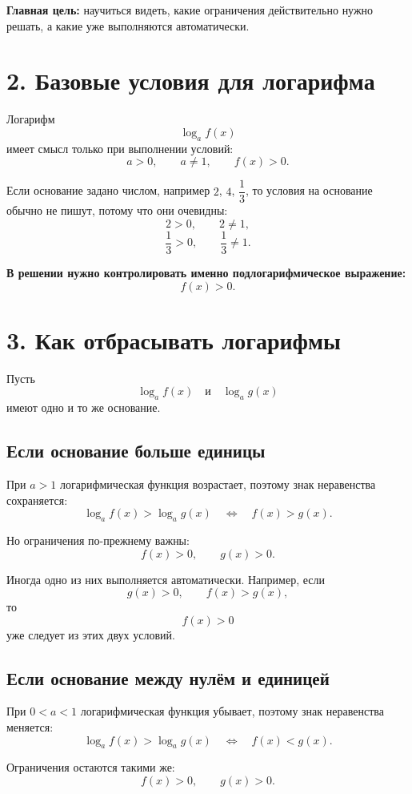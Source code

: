 \documentclass[a4paper,12pt]{article}
\newcommand{\sectionline}{\vspace{0.35em}{\color{accent}\hrule height 0.6pt}\vspace{0.65em}}
\newcommand{\important}[1]{\textcolor{darkaccent}{\textbf{#1}}}
\begin{document}
\important{Главная цель:} научиться видеть, какие ограничения действительно нужно решать, а какие уже выполняются автоматически.

\section*{\textcolor{darkaccent}{2. Базовые условия для логарифма}}
\sectionline

Логарифм
\[
\log_a f(x)
\]
имеет смысл только при выполнении условий:
\[
a>0,\qquad a\ne1,\qquad f(x)>0.
\]

Если основание задано числом, например $2$, $4$, $\dfrac13$, то условия на основание обычно не пишут, потому что они очевидны:
\[
2>0,\qquad 2\ne1,
\]
\[
\frac13>0,\qquad \frac13\ne1.
\]

\important{В решении нужно контролировать именно подлогарифмическое выражение:}
\[
f(x)>0.
\]

\section*{\textcolor{darkaccent}{3. Как отбрасывать логарифмы}}
\sectionline

Пусть
\[
\log_a f(x) \quad \text{и} \quad \log_a g(x)
\]
имеют одно и то же основание.

\subsection*{\textcolor{accent}{Если основание больше единицы}}

При $a>1$ логарифмическая функция возрастает, поэтому знак неравенства сохраняется:
\[
\log_a f(x)>\log_a g(x)
\quad\Longleftrightarrow\quad
f(x)>g(x).
\]

Но ограничения по-прежнему важны:
\[
f(x)>0,\qquad g(x)>0.
\]

Иногда одно из них выполняется автоматически. Например, если
\[
g(x)>0,\qquad f(x)>g(x),
\]
то
\[
f(x)>0
\]
уже следует из этих двух условий.

\subsection*{\textcolor{accent}{Если основание между нулём и единицей}}

При $0<a<1$ логарифмическая функция убывает, поэтому знак неравенства меняется:
\[
\log_a f(x)>\log_a g(x)
\quad\Longleftrightarrow\quad
f(x)<g(x).
\]

Ограничения остаются такими же:
\[
f(x)>0,\qquad g(x)>0.
\]
\end{document}
